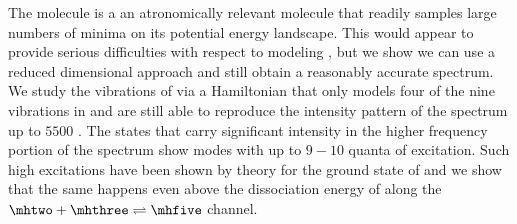 
The \hfive{} molecule is a an atronomically relevant molecule that readily samples large numbers of minima on its potential energy landscape. This would appear to provide serious difficulties with respect to modeling \hfive{}, but we show we can use a reduced dimensional approach and still obtain a reasonably accurate spectrum. We study the vibrations of \hfive{} via a Hamiltonian that only models four of the nine vibrations in \hfive{} and are still able to reproduce the intensity pattern of the spectrum up to \squigg$5500$ \wavenumbers{}.  The states that carry significant intensity in the higher frequency portion of the spectrum show \hplus{} modes with up to $9-10$ quanta of excitation. Such high excitations have been shown by theory for the ground state of \hfive{} and we show that the same happens even above the dissociation energy of \hfive{} along the $\mhtwo + \mhthree \rightleftharpoons \mhfive$ channel.
